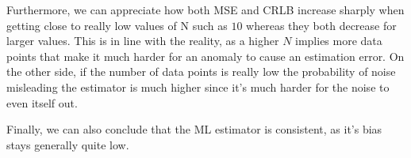 \documentclass[conference,9pt]{IEEEtran}
\begin{document}
Furthermore, we can appreciate how both MSE and CRLB increase sharply when getting close to really low values of N such as $10$ whereas they both decrease for larger values. This is in line with the reality, as a higher $N$ implies more data points that make it much harder for an anomaly to cause an estimation error. On the other side, if the number of data points is really low the probability of noise misleading the estimator is much higher since it's much harder for the noise to even itself out.

Finally, we can also conclude that the ML estimator is consistent, as it's bias stays generally quite low.
\end{document}
